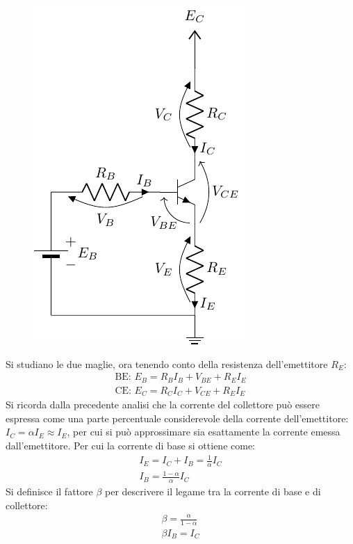 \documentclass{article}
\numberwithin{equation}{subsection}
\begin{document}
\begin{figure}[H]%
    \centering
    \includegraphics{bjt-circuito-polarizzazione.pdf}%
    \label{fig:bjt-circuito-polarizzazione}
\end{figure}

Si studiano le due maglie, ora tenendo conto della resistenza dell'emettitore $R_E$:
\begin{gather*}
    \mbox{BE: }E_B=R_BI_B+V_{BE}+R_EI_E\\
    \mbox{CE: }E_C=R_CI_C+V_{CE}+R_EI_E
\end{gather*}
Si ricorda dalla precedente analisi che la corrente del collettore può essere espressa come una parte percentuale considerevole della corrente dell'emettitore: 
$I_C=\alpha I_E\approx I_E$, per cui si può approssimare sia esattamente la corrente emessa dall'emettitore. Per cui la corrente di base 
si ottiene come:
\begin{gather*}
    I_E=I_C+I_B=\displaystyle\frac{1}{\alpha}I_C\\
    I_B=\displaystyle\frac{1-\alpha}{\alpha}I_C
\end{gather*}
Si definisce il fattore $\beta$ per descrivere il legame tra la corrente di base e di collettore:
\begin{gather*}
    \beta=\displaystyle\frac{\alpha}{1-\alpha}\\
    \beta I_B=I_C
\end{gather*}
\end{document}
